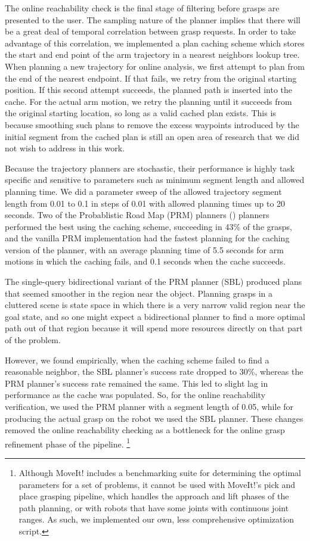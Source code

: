 The online reachability check is the final stage of filtering before grasps are presented to the user. The sampling nature of the planner implies that there will be a great deal of temporal correlation between grasp requests. In order to take advantage of this correlation, we implemented a plan caching scheme which stores the start and end point of the arm trajectory in a nearest neighbors lookup tree. When planning a new trajectory for online analysis, we first attempt to plan from the end of the nearest endpoint. If that fails, we retry from the original starting position. If this second attempt succeeds, the planned path is inserted into the cache. For the actual arm motion, we retry the planning until it succeeds from the original starting location, so long as a valid cached plan exists. This is because smoothing such plans to remove the excess waypoints introduced by the initial segment from the cached plan is still an open area of research that we did not wish to address in this work.  

Because the trajectory planners are stochastic, their performance is highly task specific and sensitive to parameters such as minimum segment length and allowed planning time. We did a parameter sweep of the allowed trajectory segment length from 0.01 to 0.1 in steps of 0.01 with allowed planning times up to 20 seconds. Two of the Probablistic Road Map (PRM) planners (\cite{PRM}) planners performed the best using the caching scheme, succeeding in 43\% of the grasps, and the vanilla PRM implementation had the fastest planning for the caching version of the planner, with an average planning time of 5.5 seconds for arm motions in which the caching fails, and 0.1 seconds when the cache succeeds. 

The single-query bidirectional variant of the PRM planner (SBL) produced plans that seemed smoother in the region near the object. Planning grasps in a cluttered scene is state space in which there is a very narrow valid region near the goal state, and so one might expect a bidirectional planner to find a more optimal path out of that region because it will spend more resources directly on that part of the problem. 

However, we found empirically, when the caching scheme failed to find a reasonable neighbor, the SBL planner's success rate dropped to 30\%, whereas the PRM planner's success rate remained the same. This led to slight lag in performance as the cache was populated. So, for the online reachability verification, we used the PRM planner with a segment length of 0.05, while for producing the actual grasp on the robot we used the SBL planner. These changes removed the online reachability checking as a bottleneck for the online grasp refinement phase of the pipeline. \footnote{Although MoveIt! includes a benchmarking suite for determining the optimal parameters for a set of problems, it cannot be used with MoveIt!'s pick and place grasping pipeline, which handles the approach and lift phases of the path planning, or with robots that have some joints with continuous joint ranges. As such, we implemented our own, less comprehensive optimization script.}

